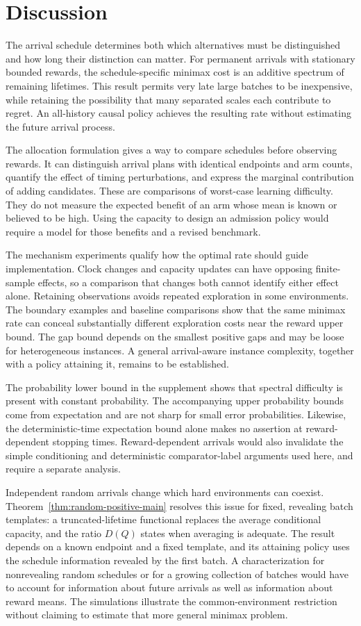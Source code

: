 \section{Discussion}
The arrival schedule determines both which alternatives must be distinguished and how long their distinction can matter. For permanent arrivals with stationary bounded rewards, the schedule-specific minimax cost is an additive spectrum of remaining lifetimes. This result permits very late large batches to be inexpensive, while retaining the possibility that many separated scales each contribute to regret. An all-history causal policy achieves the resulting rate without estimating the future arrival process.

The allocation formulation gives a way to compare schedules before observing rewards. It can distinguish arrival plans with identical endpoints and arm counts, quantify the effect of timing perturbations, and express the marginal contribution of adding candidates. These are comparisons of worst-case learning difficulty. They do not measure the expected benefit of an arm whose mean is known or believed to be high. Using the capacity to design an admission policy would require a model for those benefits and a revised benchmark.

The mechanism experiments qualify how the optimal rate should guide implementation. Clock changes and capacity updates can have opposing finite-sample effects, so a comparison that changes both cannot identify either effect alone. Retaining observations avoids repeated exploration in some environments. The boundary examples and baseline comparisons show that the same minimax rate can conceal substantially different exploration costs near the reward upper bound. The gap bound depends on the smallest positive gaps and may be loose for heterogeneous instances. A general arrival-aware instance complexity, together with a policy attaining it, remains to be established.

The probability lower bound in the supplement shows that spectral difficulty is present with constant probability. The accompanying upper probability bounds come from expectation and are not sharp for small error probabilities. Likewise, the deterministic-time expectation bound alone makes no assertion at reward-dependent stopping times. Reward-dependent arrivals would also invalidate the simple conditioning and deterministic comparator-label arguments used here, and require a separate analysis.

Independent random arrivals change which hard environments can coexist. Theorem~\ref{thm:random-positive-main} resolves this issue for fixed, revealing batch templates: a truncated-lifetime functional replaces the average conditional capacity, and the ratio $D(Q)$ states when averaging is adequate. The result depends on a known endpoint and a fixed template, and its attaining policy uses the schedule information revealed by the first batch. A characterization for nonrevealing random schedules or for a growing collection of batches would have to account for information about future arrivals as well as information about reward means. The simulations illustrate the common-environment restriction without claiming to estimate that more general minimax problem.
